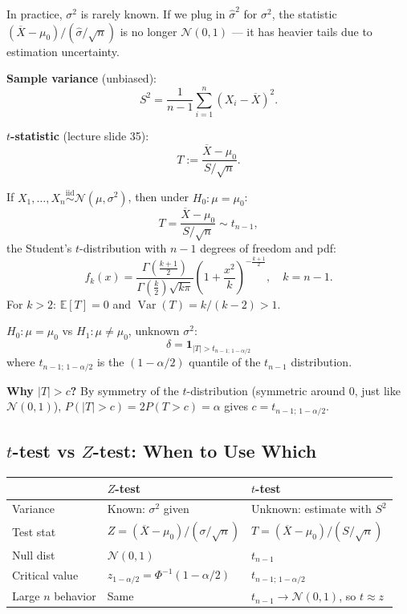 \documentclass[11pt,a4paper]{article}
\newcommand{\E}{\mathbb{E}}
\newcommand{\iid}{\overset{\text{iid}}{\sim}}
\begin{document}
In practice, $\sigma^2$ is rarely known. If we plug in $\hat\sigma^2$ for $\sigma^2$, the statistic $(\overline{X}-\mu_0)/(\hat\sigma/\sqrt{n})$ is no longer $\mathcal{N}(0,1)$ --- it has heavier tails due to estimation uncertainty.

\begin{tcolorbox}[defbox, title={Sample variance and $t$-statistic}]
\textbf{Sample variance} (unbiased):
\[
  S^2 = \frac{1}{n-1}\sum_{i=1}^n(X_i-\overline{X})^2.
\]

\textbf{$t$-statistic} (lecture slide 35):
\[
  T := \frac{\overline{X}-\mu_0}{S/\sqrt{n}}.
\]
\end{tcolorbox}

\begin{tcolorbox}[thmbox, title={Student's $t$-distribution (Lecture slide 36)}]
If $X_1,\ldots,X_n \iid \mathcal{N}(\mu,\sigma^2)$, then under $H_0:\mu=\mu_0$:
\[
  T = \frac{\overline{X}-\mu_0}{S/\sqrt{n}} \sim t_{n-1},
\]
the Student's $t$-distribution with $n-1$ degrees of freedom and pdf:
\[
  f_k(x) = \frac{\Gamma\!\left(\frac{k+1}{2}\right)}{\Gamma\!\left(\frac{k}{2}\right)\sqrt{k\pi}}\left(1+\frac{x^2}{k}\right)^{-\frac{k+1}{2}}, \quad k=n-1.
\]
For $k>2$: $\E[T]=0$ and $\operatorname{Var}(T)=k/(k-2)>1$.
\end{tcolorbox}

\begin{tcolorbox}[thmbox, title={Bilateral $t$-test (Lecture slide 37)}]
$H_0:\mu=\mu_0$ vs $H_1:\mu\neq\mu_0$, unknown $\sigma^2$:
\[
  \boxed{\delta = \mathbf{1}_{\left|T\right|>t_{n-1;\,1-\alpha/2}}}
\]
where $t_{n-1;\,1-\alpha/2}$ is the $(1-\alpha/2)$ quantile of the $t_{n-1}$ distribution.

\medskip
\textbf{Why $|T|>c$?} By symmetry of the $t$-distribution (symmetric around 0, just like $\mathcal{N}(0,1)$), $P(|T|>c)=2P(T>c)=\alpha$ gives $c=t_{n-1;\,1-\alpha/2}$.
\end{tcolorbox}

\subsection{$t$-test vs $Z$-test: When to Use Which}

\begin{center}
\renewcommand{\arraystretch}{1.4}
\begin{tabular}{@{}lll@{}}
\toprule
& \textbf{$Z$-test} & \textbf{$t$-test}\\
\midrule
Variance & Known: $\sigma^2$ given & Unknown: estimate with $S^2$\\
Test stat & $Z=(\overline{X}-\mu_0)/(\sigma/\sqrt{n})$ & $T=(\overline{X}-\mu_0)/(S/\sqrt{n})$\\
Null dist & $\mathcal{N}(0,1)$ & $t_{n-1}$\\
Critical value & $z_{1-\alpha/2}=\Phi^{-1}(1-\alpha/2)$ & $t_{n-1;\,1-\alpha/2}$\\
Large $n$ behavior & Same & $t_{n-1}\to\mathcal{N}(0,1)$, so $t\approx z$\\
\bottomrule
\end{tabular}
\end{center}
\end{document}
